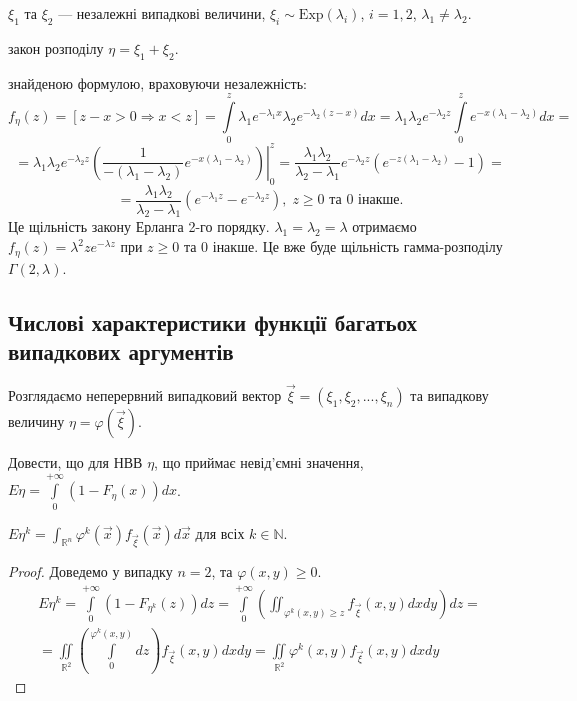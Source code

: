 \begin{example}
    $\xi_1$ та $\xi_2$ --- незалежні випадкові величини, $\xi_i \sim \mathrm{Exp}(\lambda_i)$, 
    $i = 1,2$, $\lambda_1 \neq \lambda_2$.

     закон розподілу $\eta = \xi_1 + \xi_2$.

     знайденою формулою, враховуючи незалежність:
    \begin{equation*}
        f_\eta(z) = \left[z - x > 0 \Rightarrow x < z\right] = 
        \int\limits_0^z \lambda_1 e^{-\lambda_1 x}\lambda_2e^{-\lambda_2(z-x)}dx
        =
        \lambda_1\lambda_2e^{-\lambda_2z}\int\limits_0^z e^{-x(\lambda_1 - \lambda_2)} dx=
    \end{equation*}
    \begin{equation*}
        =\lambda_1\lambda_2e^{-\lambda_2z}
        \left.
        \left(\frac{1}{-(\lambda_1 - \lambda_2)} e^{-x(\lambda_1 - \lambda_2)}\right)
        \right|_0^z = 
        \frac{\lambda_1\lambda_2}{\lambda_2 - \lambda_1}e^{-\lambda_2z}
        (e^{-z(\lambda_1 - \lambda_2)} - 1) =
    \end{equation*}
    \begin{equation*}
        = \frac{\lambda_1\lambda_2}{\lambda_2 - \lambda_1}(e^{-\lambda_1 z} - e^{-\lambda_2 z})
        ,\; z \geq 0 \text{ та } 0 \text{ інакше.}
    \end{equation*}
Це щільність закону Ерланга 2-го порядку.
 $\lambda_1 = \lambda_2 = \lambda$ отримаємо
$f_{\eta}(z) = \lambda^2 z e^{-\lambda z}$ при $z \geq 0$ та $0$ інакше.
Це вже буде щільність гамма-розподілу $\Gamma(2, \lambda)$.
\end{example}

\subsection{Числові характеристики функції багатьох випадкових аргументів}
Розглядаємо неперервний випадковий вектор $\vec{\xi} = (\xi_1, \xi_2, ..., \xi_n)$ та
випадкову величину $\eta = \varphi(\vec{\xi})$.
\begin{exercise}
    Довести, що для НВВ $\eta$, що приймає невід'ємні значення, $E\eta = \int\limits_0^{+\infty} (1 - F_{\eta}(x)) dx$.
\end{exercise}

\begin{proposition*} 
    $E\eta^k = \int_{\mathbb{R}^n} \varphi^k(\vec{x}) f_{\vec{\xi}} (\vec{x}) d\vec{x}$ для всіх $k \in \mathbb{N}$.
\end{proposition*}
\begin{proof}
    Доведемо у випадку $n=2$, та $\varphi(x, y) \geq 0$.
    \begin{gather*}
        E\eta^k = \int\limits_0^{+\infty} \left(1 - F_{\eta^k}(z)\right) dz = 
    \int\limits_0^{+\infty} \left({\iint_{\varphi^k(x,y) \geq z}} f_{\vec{\xi}}(x,y) dx dy\right) dz = \\
    =\iint\limits_{\mathbb{R}^2} \left( \int\limits_0^{\varphi^k(x,y)} dz\right) f_{\vec{\xi}}(x,y) dx dy = 
     \iint\limits_{\mathbb{R}^2} \varphi^k(x,y) f_{\vec{\xi}}(x,y) dx dy
    \end{gather*}
\end{proof}

